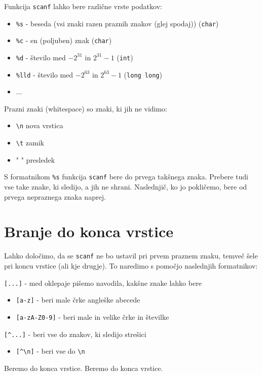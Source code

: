 \documentclass{book}
\begin{document}
Funkcija \verb+scanf+ lahko bere različne vrste podatkov:
\begin{itemize}
	\item \verb+%s+ - beseda (vsi znaki razen praznih znakov (glej spodaj)) (\verb+char+)
	\item \verb+%c+ - en (poljuben) znak (\verb+char+)
	\item \verb+%d+ - število med $-2^{31}$ in $2^{31}-1$ (\verb+int+)
	\item \verb+%lld+ - število med $-2^{63}$ in $2^{63}-1$ (\verb+long long+)
	\item ...
\end{itemize}

\noindent Prazni znaki (whitespace) so znaki, ki jih ne vidimo:
\begin{itemize}
	\item \verb+\n+ nova vrstica
	\item \verb+\t+ zamik
	\item " " presledek
\end{itemize}

S formatnikom \verb+%s+ funkcija \verb+scanf+ bere do prvega takšnega znaka. Prebere tudi vse take znake, ki sledijo, a jih ne shrani. Naslednjič, ko jo pokličemo, bere od prvega nepraznega znaka naprej.

\section{Branje do konca vrstice}

Lahko določimo, da se \verb+scanf+ ne bo ustavil pri prvem praznem znaku, temveč
šele pri koncu vrstice (ali kje drugje).
To naredimo s pomočjo naslednjih formatnikov:

\verb+[...]+ - med oklepaje pišemo navodila, kakšne znake lahko bere
\begin{itemize}
\item \verb+[a-z]+ - beri male črke angleške abecede
\item \verb+[a-zA-Z0-9]+ - beri male in velike črke in številke
\end{itemize}

\verb+[^...]+ - beri vse do znakov, ki sledijo strešici
\begin{itemize}
\item \verb+[^\n]+ - beri vse do \verb+\n+
\end{itemize}

\begin{examples}


\begin{inout}
Beremo do konca vrstice.
\tcblower
Beremo do konca vrstice.
\end{inout}

\end{examples}
\end{document}
